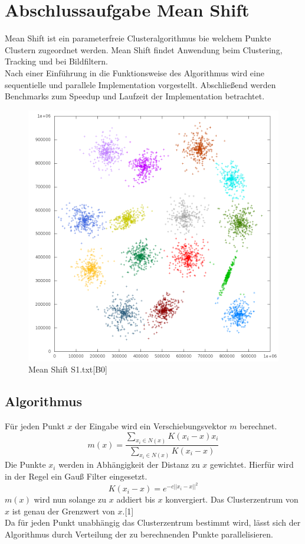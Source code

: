 \chapter{Abschlussaufgabe Mean Shift}
Mean Shift ist ein parameterfreie Clusteralgorithmus bie welchem Punkte Clustern zugeordnet werden. Mean Shift findet Anwendung beim Clustering,
Tracking und bei Bildfiltern.\\
Nach einer Einführung in die Funktionsweise des Algorithmus wird eine sequentielle und parallele Implementation vorgestellt.
Abschließend werden Benchmarks zum Speedup und Laufzeit der Implementation betrachtet.\\
\begin{figure}[h]
	\centering
	\includegraphics[scale=0.6]{../meanshift/output/pics/s1_colored.png} 
	\caption{Mean Shift S1.txt[B0]}
\end{figure}
\section{Algorithmus}
	Für jeden Punkt $ x $ der Eingabe wird ein Verschiebungsvektor $ m $ berechnet. 
		\[ m(x) = \frac{\sum_{x_i \in N(x)} K(x_i - x) x_i }{\sum_{x_i \in N(x)} K(x_i - x)} \]
	Die Punkte $ x_i $ werden in Abhängigkeit der Distanz zu $ x $ gewichtet. Hierfür wird in der Regel ein Gauß Filter eingesetzt.
		\[K(x_i - x) = e^{-c||x_i - x||^2} \]
	$ m(x) $ wird nun solange zu $ x $ addiert bis $ x $ konvergiert. Das Clusterzentrum von $ x $ ist genau der Grenzwert von $ x $.[1]\\
	Da für jeden Punkt unabhängig das Clusterzentrum bestimmt wird, lässt sich der Algorithmus durch Verteilung der zu berechnenden Punkte parallelisieren.\\
